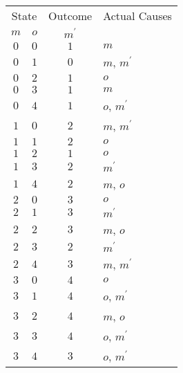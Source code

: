 \begin{tabular}{cccl}
\toprule
\multicolumn{2}{c}{State} & Outcome & Actual Causes \\ \cmidrule(lr){1-2}
$m$ & $o$ & $m^\prime$ &  \\
\midrule
$0$ & $0$ & $1$ & $m$ \\
$0$ & $1$ & $0$ & $m$, $m^\prime$ \\
$0$ & $2$ & $1$ & $o$ \\
$0$ & $3$ & $1$ & $m$ \\
$0$ & $4$ & $1$ & $o$, $m^\prime$ \\
$1$ & $0$ & $2$ & $m$, $m^\prime$ \\
$1$ & $1$ & $2$ & $o$ \\
$1$ & $2$ & $1$ & $o$ \\
$1$ & $3$ & $2$ & $m^\prime$ \\
$1$ & $4$ & $2$ & $m$, $o$ \\
$2$ & $0$ & $3$ & $o$ \\
$2$ & $1$ & $3$ & $m^\prime$ \\
$2$ & $2$ & $3$ & $m$, $o$ \\
$2$ & $3$ & $2$ & $m^\prime$ \\
$2$ & $4$ & $3$ & $m$, $m^\prime$ \\
$3$ & $0$ & $4$ & $o$ \\
$3$ & $1$ & $4$ & $o$, $m^\prime$ \\
$3$ & $2$ & $4$ & $m$, $o$ \\
$3$ & $3$ & $4$ & $o$, $m^\prime$ \\
$3$ & $4$ & $3$ & $o$, $m^\prime$ \\
\bottomrule
\end{tabular}
